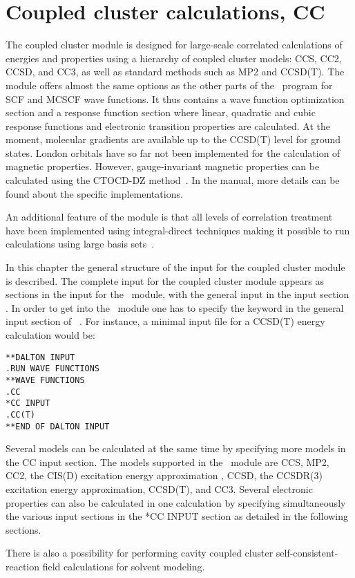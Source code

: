 \chapter{Coupled cluster calculations, CC}\label{ch:CC}

The coupled cluster module {\cc} is designed for large-scale
correlated calculations of energies and properties using a
hierarchy of coupled cluster models: CCS, CC2, CCSD, and CC3, as well as standard methods such as MP2 and CCSD(T).
The module offers almost the same options as the other
parts of the \dalton\ program for SCF and MCSCF wave functions.
It thus contains a wave function optimization section and 
a response function section
where linear, quadratic and cubic response functions and electronic
transition properties are calculated.
At the moment, molecular gradients are available 
up to the CCSD(T) level for ground states.  
London orbitals have so far not been implemented 
for the calculation of magnetic
properties.
However, gauge-invariant magnetic properties can be calculated using the
CTOCD-DZ method~\cite{ctocd,pccpcctocd}.
In the manual, more details can be found about the specific implementations.

An additional feature of the module is that all levels of correlation
treatment have been implemented using integral-direct techniques making
it possible to run calculations using large basis
sets~\cite{directCC}.

In this chapter the general structure of the input for the
coupled cluster module is described.
The complete input for the coupled cluster module appears as
sections in the input for the \sir\ module, with the general
input in the input section . In order to get into the \cc\ module
one has to specify the  keyword in the general input
section of \sir\ . For instance, a minimal
input file for a CCSD(T) energy calculation would be:
\begin{verbatim}
**DALTON INPUT
.RUN WAVE FUNCTIONS
**WAVE FUNCTIONS
.CC
*CC INPUT
.CC(T)
**END OF DALTON INPUT
\end{verbatim}

Several models can be calculated at the same time by specifying more models
in the CC input section. 
The models supported in the \cc\ module are 
CCS\cite{Christiansen:CPL243},
MP2\cite{Moller34},
CC2\cite{Christiansen:CPL243},
the CIS(D) excitation energy approximation \cite{Head-Gordon:94},
CCSD\cite{Purvis82},
the CCSDR(3) excitation energy approximation\cite{Christiansen:PERTURBATIVE_TRIPLES}, 
CCSD(T)\cite{Raghavachari89}, and CC3\cite{Christiansen:JCP103,Koch:JCP106}.
Several electronic properties can also 
be calculated in one calculation by specifying simultaneously 
the various input sections in the *CC INPUT section
as detailed in the following sections.

There is also a possibility for performing cavity coupled cluster
self-consistent-reaction field calculations for solvent modeling.
